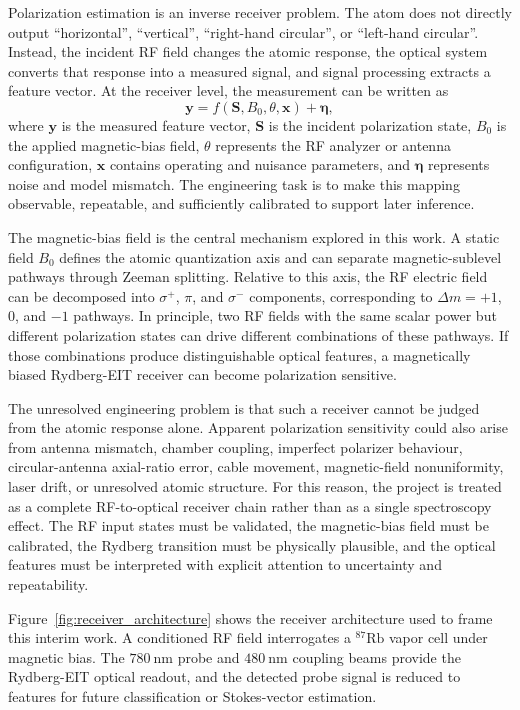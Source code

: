 \documentclass{ieeeaccess}
\begin{document}
Polarization estimation is an inverse receiver problem. The atom does not directly output ``horizontal'', ``vertical'', ``right-hand circular'', or ``left-hand circular''. Instead, the incident RF field changes the atomic response, the optical system converts that response into a measured signal, and signal processing extracts a feature vector. At the receiver level, the measurement can be written as
\begin{equation}
\mathbf{y}=f(\mathbf{S},B_0,\theta,\mathbf{x})+\boldsymbol{\eta},
\label{eq:intro_forward_model}
\end{equation}
where \(\mathbf{y}\) is the measured feature vector, \(\mathbf{S}\) is the incident polarization state, \(B_0\) is the applied magnetic-bias field, \(\theta\) represents the RF analyzer or antenna configuration, \(\mathbf{x}\) contains operating and nuisance parameters, and \(\boldsymbol{\eta}\) represents noise and model mismatch. The engineering task is to make this mapping observable, repeatable, and sufficiently calibrated to support later inference.

The magnetic-bias field is the central mechanism explored in this work. A static field \(B_0\) defines the atomic quantization axis and can separate magnetic-sublevel pathways through Zeeman splitting. Relative to this axis, the RF electric field can be decomposed into \(\sigma^+\), \(\pi\), and \(\sigma^-\) components, corresponding to \(\Delta m=+1\), 0, and \(-1\) pathways. In principle, two RF fields with the same scalar power but different polarization states can drive different combinations of these pathways. If those combinations produce distinguishable optical features, a magnetically biased Rydberg-EIT receiver can become polarization sensitive.

The unresolved engineering problem is that such a receiver cannot be judged from the atomic response alone. Apparent polarization sensitivity could also arise from antenna mismatch, chamber coupling, imperfect polarizer behaviour, circular-antenna axial-ratio error, cable movement, magnetic-field nonuniformity, laser drift, or unresolved atomic structure. For this reason, the project is treated as a complete RF-to-optical receiver chain rather than as a single spectroscopy effect. The RF input states must be validated, the magnetic-bias field must be calibrated, the Rydberg transition must be physically plausible, and the optical features must be interpreted with explicit attention to uncertainty and repeatability.

Figure~\ref{fig:receiver_architecture} shows the receiver architecture used to frame this interim work. A conditioned RF field interrogates a \(^{87}\mathrm{Rb}\) vapor cell under magnetic bias. The \(780~\mathrm{nm}\) probe and \(480~\mathrm{nm}\) coupling beams provide the Rydberg-EIT optical readout, and the detected probe signal is reduced to features for future classification or Stokes-vector estimation.
\end{document}
